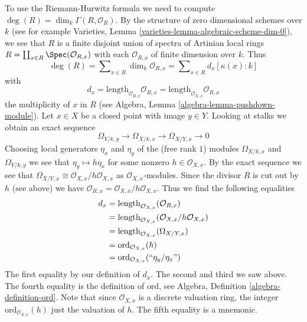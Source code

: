 \medskip\noindent
To use the Riemann-Hurwitz formula we need to compute
$\deg(R) = \dim_k \Gamma(R, \mathcal{O}_R)$. By the structure
of zero dimensional schemes over $k$ (see for example
Varieties, Lemma \ref{varieties-lemma-algebraic-scheme-dim-0}),
we see that $R$ is a finite disjoint union of spectra of
Artinian local rings $R = \coprod_{x \in R} \Spec(\mathcal{O}_{R, x})$
with each $\mathcal{O}_{R, x}$ of finite dimension over $k$. Thus
$$
\deg(R) = \sum\nolimits_{x \in R} \dim_k \mathcal{O}_{R, x} =
\sum\nolimits_{x \in R} d_x [\kappa(x) : k]
$$
with
$$
d_x = \text{length}_{\mathcal{O}_{R, x}} \mathcal{O}_{R, x} =
\text{length}_{\mathcal{O}_{X, x}} \mathcal{O}_{R, x}
$$
the multiplicity of $x$ in $R$
(see Algebra, Lemma \ref{algebra-lemma-pushdown-module}).
Let $x \in X$ be a closed point with image $y \in Y$.
Looking at stalks we obtain an exact sequence
$$
\Omega_{Y/k, y} \to \Omega_{X/k, x} \to \Omega_{X/Y, x} \to 0
$$
Choosing local generators $\eta_x$ and $\eta_y$ of the
(free rank $1$) modules $\Omega_{X/k, x}$ and $\Omega_{Y/k, y}$
we see that
$
\eta_y \mapsto h \eta_x
$
for some nonzero $h \in \mathcal{O}_{X, x}$. By the exact sequence we see that
$\Omega_{X/Y, x} \cong \mathcal{O}_{X, x}/h\mathcal{O}_{X, x}$
as $\mathcal{O}_{X, x}$-modules. Since the divisor
$R$ is cut out by $h$ (see above) we have
$\mathcal{O}_{R, x} = \mathcal{O}_{X, x}/h\mathcal{O}_{X, x}$.
Thus we find the following equalities
\begin{align*}
d_x
& =
\text{length}_{\mathcal{O}_{X, x}}(\mathcal{O}_{R, x}) \\
& =
\text{length}_{\mathcal{O}_{X, x}}(\mathcal{O}_{X, x}/h\mathcal{O}_{X, x}) \\
& =
\text{length}_{\mathcal{O}_{X, x}}(\Omega_{X/Y, x}) \\
& =
\text{ord}_{\mathcal{O}_{X, x}}(h) \\
& =
\text{ord}_{\mathcal{O}_{X, x}}(``\eta_y/\eta_x")
\end{align*}
The first equality by our definition of $d_x$. The second and third
we saw above. The fourth equality is the definition of $\text{ord}$, see
Algebra, Definition \ref{algebra-definition-ord}. Note that since
$\mathcal{O}_{X, x}$ is a discrete valuation ring, the integer
$\text{ord}_{\mathcal{O}_{X, x}}(h)$ just the valuation of $h$.
The fifth equality is a mnemonic.

